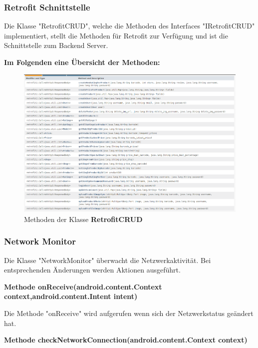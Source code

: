 \documentclass{scrartcl}
\begin{document}
\newpage

\subsubsection{Retrofit Schnittstelle}

Die Klasse "RetrofitCRUD", welche die Methoden des Interfaces "IRetrofitCRUD" implementiert, stellt die Methoden für Retrofit zur Verfügung und ist die Schnittstelle zum Backend Server. \newline 

\noindent\textbf{Im Folgenden eine Übersicht der Methoden:}

\noindent

\begin{figure}[h]
\centering
\includegraphics[width=450px]{img/retrofit_crud_method_overview.png}
\caption{Methoden der Klasse \textbf{RetrofitCRUD}}
\end{figure}

\subsubsection{Network Monitor}
Die Klasse "NetworkMonitor" überwacht die Netzwerkaktivität. Bei entsprechenden Änderungen werden Aktionen ausgeführt. \newline

\noindent\textbf{Methode onReceive(android.content.Context context,\newline               android.content.Intent intent)}

\noindent Die Methode "onReceive" wird aufgerufen wenn sich der Netzwerkstatus geändert hat. \newline 

\noindent\textbf{Methode checkNetworkConnection(android.content.Context context)}
\end{document}
